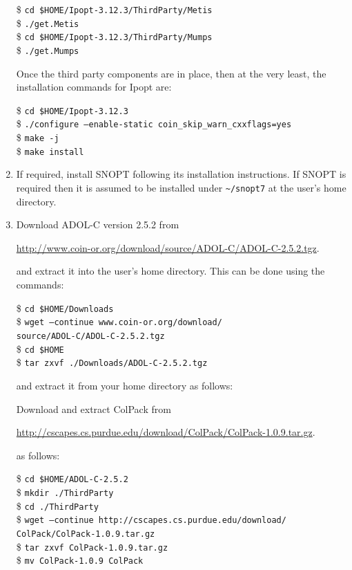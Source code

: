 \documentclass[a4paper,11pt]{report}    %
\newcommand{\shell}[1]{\$ \texttt{#1}\\}
\newcommand{\shellcont}[1]{\texttt{#1}\\}
\newenvironment{shadedframe}{%
  \def\FrameCommand{\fcolorbox{black}{shadecolor}}%
  \MakeFramed {\FrameRestore}}
{\endMakeFramed}
\begin{document}
\begin{enumerate}
\begin{shadedframe}
\shell{cd \$HOME/Ipopt-3.12.3/ThirdParty/Metis}
\shell{./get.Metis}
\shell{cd \$HOME/Ipopt-3.12.3/ThirdParty/Mumps}
\shell{./get.Mumps}
\end{shadedframe}


Once the third party components are in place, then at the very least, the installation commands for Ipopt are:

\begin{shadedframe}
\shell{cd \$HOME/Ipopt-3.12.3}
\shell{./configure --enable-static coin\_skip\_warn\_cxxflags=yes}
\shell{make -j}
\shell{make install}
\end{shadedframe}


\item If required, install SNOPT  following its installation instructions. 
 If SNOPT is required then it is assumed  to be installed under
\verb|~/snopt7| at the user's home directory. 

\item Download ADOL-C version 2.5.2 from 

\href{http://www.coin-or.org/download/source/ADOL-C/ADOL-C-2.5.2.tgz}{http://www.coin-or.org/download/source/ADOL-C/ADOL-C-2.5.2.tgz}.

and extract it into the user's home directory. This can be done using the commands:

\begin{shadedframe}
\shell{cd \$HOME/Downloads}
\shell{wget --continue www.coin-or.org/download/}
\shellcont{source/ADOL-C/ADOL-C-2.5.2.tgz}
\shell{cd \$HOME}
\shell{tar zxvf ./Downloads/ADOL-C-2.5.2.tgz}
\end{shadedframe}

and extract it from your home directory as follows:

Download and extract ColPack from

\href{http://cscapes.cs.purdue.edu/download/ColPack/ColPack-1.0.9.tar.gz}{http://cscapes.cs.purdue.edu/download/ColPack/ColPack-1.0.9.tar.gz}.

as follows:

\begin{shadedframe}
\shell{cd \$HOME/ADOL-C-2.5.2}
\shell{mkdir ./ThirdParty}
\shell{cd ./ThirdParty}
\shell{wget --continue http://cscapes.cs.purdue.edu/download/}
\shellcont{ColPack/ColPack-1.0.9.tar.gz}
\shell{tar zxvf ColPack-1.0.9.tar.gz}
\shell{mv ColPack-1.0.9 ColPack}
\end{shadedframe}


\end{enumerate}
\end{document}
